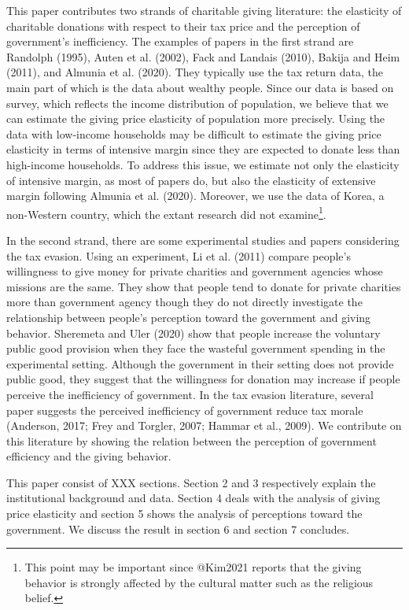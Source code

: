 \documentclass[ review  , 3p ]{elsarticle}
\begin{document}
  This paper contributes two strands of charitable giving literature: the elasticity of charitable donations with respect to their tax price and the perception of government's inefficiency. The examples of papers in the first strand are Randolph (1995), Auten et al. (2002), Fack and Landais (2010), Bakija and Heim (2011), and Almunia et al. (2020). They typically use the tax return data, the main part of which is the data about wealthy people. Since our data is based on survey, which reflects the income distribution of population, we believe that we can estimate the giving price elasticity of population more precisely. Using the data with low-income households may be difficult to estimate the giving price elasticity in terms of intensive margin since they are expected to donate less than high-income households. To address this issue, we estimate not only the elasticity of intensive margin, as most of papers do, but also the elasticity of extensive margin following Almunia et al. (2020).
  Moreover, we use the data of Korea, a non-Western country, which the extant research did not examine\footnote{This point may be important since @Kim2021 reports that the giving behavior is strongly affected by the cultural matter such as the religious belief.}.
  
  In the second strand, there are some experimental studies and papers considering the tax evasion. Using an experiment, Li et al. (2011) compare people's willingness to give money for private charities and government agencies whose missions are the same. They show that people tend to donate for private charities more than government agency though they do not directly investigate the relationship between people's perception toward the government and giving behavior. Sheremeta and Uler (2020) show that people increase the voluntary public good provision when they face the wasteful government spending in the experimental setting. Although the government in their setting does not provide public good, they suggest that the willingness for donation may increase if people perceive the inefficiency of government. In the tax evasion literature, several paper suggests the perceived inefficiency of government reduce tax morale (Anderson, 2017; Frey and Torgler, 2007; Hammar et al., 2009). We contribute on this literature by showing the relation between the perception of government efficiency and the giving behavior.
  
  This paper consist of XXX sections. Section 2 and 3 respectively explain the institutional background and data. Section 4 deals with the analysis of giving price elasticity and section 5 shows the analysis of perceptions toward the government. We discuss the result in section 6 and section 7 concludes.
  
\end{document}
